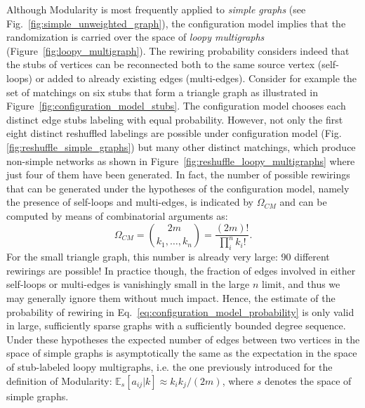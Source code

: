Although Modularity is most frequently applied to \emph{simple graphs} (see Fig.~\ref{fig:simple_unweighted_graph}), the configuration model implies that the randomization is carried over the space of \emph{loopy multigraphs} (Figure~\ref{fig:loopy_multigraph}).
The rewiring probability considers indeed that the stubs of vertices can be reconnected both to the same source vertex (self-loops) or added to already existing edges (multi-edges).
Consider for example the set of matchings on six stubs that form a triangle graph as illustrated in Figure~\ref{fig:configuration_model_stubs}. The configuration model chooses each distinct edge stubs labeling with equal probability. However, not only the first eight distinct reshuffled labelings are possible under configuration model (Fig.\ref{fig:reshuffle_simple_graphs}) but many other distinct matchings, which produce non-simple networks as shown in Figure~\ref{fig:reshuffle_loopy_multigraphs} where just four of them have been generated. 
In fact, the number of possible rewirings that can be generated under the hypotheses of the configuration model, namely the presence of self-loops and multi-edges, is indicated by $\Omega_{CM}$ and can be computed by means of combinatorial arguments as:
\begin{equation}\label{eq:cm_possible_rewirings}
\Omega_{CM} = \binom{2m}{k_1,\ldots,k_n} = \frac{(2m)!}{\prod_i^n k_i!}.
\end{equation}
For the small triangle graph, this number is already very large: 90 different rewirings are possible!
In practice though, the fraction of edges involved in either self-loops or multi-edges is vanishingly small in the large $n$ limit, and thus we may generally ignore them without much impact. 
Hence, the estimate of the probability of rewiring in Eq.~\ref{eq:configuration_model_probability} is only valid in large, sufficiently sparse graphs with a sufficiently bounded degree sequence.
Under these hypotheses the expected number of edges between two vertices in the space of simple graphs is asymptotically the same as the expectation in the space of stub-labeled loopy multigraphs, i.e. the one previously introduced for the definition of Modularity: $\mathbb{E}_s[a_{ij} |k] \approx k_i k_j /(2m)$, where $s$ denotes the space of simple graphs.

